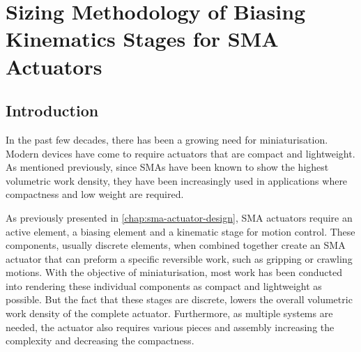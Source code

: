 
\chapter{Sizing Methodology of Biasing Kinematics Stages for SMA Actuators}\label{chap:design-methodology}


\section{Introduction}
In the past few decades, there has been a growing need for miniaturisation. Modern devices have come to require actuators that are compact and lightweight. As mentioned previously, since SMAs have been known to show the highest volumetric work density, they have been increasingly used in applications where compactness and low weight are required.

As previously presented in \cref{chap:sma-actuator-design}, SMA actuators require an active element, a biasing element and a kinematic stage for motion control. These components, usually discrete elements, when combined together create an SMA actuator that can preform a specific reversible work, such as gripping or crawling motions\todocite. With the objective of miniaturisation, most work has been conducted into rendering these individual components as compact and lightweight as possible\todocite. But the fact that these stages are discrete, lowers the overall volumetric work density of the complete actuator. Furthermore, as multiple systems are needed, the actuator also requires various pieces and assembly increasing the complexity and decreasing the compactness.

